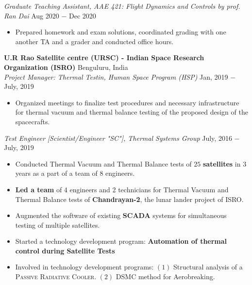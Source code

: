 \documentclass[letterpaper,11pt]{article}
\begin{document}
\vspace{3pt}
\noindent \textit{Graduate Teaching Assistant, AAE 421: Flight Dynamics and Controls by prof. Ran Dai} \hfill Aug 2020 $-$ Dec 2020
\begin{itemize}[noitemsep,nolistsep,leftmargin=0.25in,label={--}]
    \item Prepared homework and exam solutions, coordinated grading with one another 	TA and a grader and conducted office hours.
\end{itemize}

\vspace{5pt}
\noindent \textbf{U.R Rao Satellite centre (URSC) - Indian Space Research Organization (ISRO)} \hfill Benguluru, India \\
\textit{Project Manager: Thermal Testin, Human Space Program (HSP)} \hfill Jan, 2019 $-$ July, 2019
\begin{itemize}[noitemsep,nolistsep,leftmargin=0.25in,label={--}]
    \item Organized meetings to finalize test procedures and necessary infrastructure for thermal vacuum and thermal balance testing of the proposed design of the spacecrafts.
\end{itemize}

\vspace{3pt}
\textit{Test Engineer [Scientist/Engineer "SC"], Thermal Systems Group} \hfill July, 2016 $-$ July, 2019
\begin{itemize}[noitemsep,nolistsep,leftmargin=0.25in,label={--}]
    \item Conducted Thermal Vacuum and Thermal Balance tests of $25$ \textbf{satellites} in 3 years as a part of a team of 8 engineers.
	\item \textbf{Led a team} of 4 engineers and 2 technicians for Thermal Vacuum and Thermal Balance tests of \textbf{Chandrayan-2}, the lunar lander project of ISRO. 
    \item Augmented the software of existing \textbf{SCADA} systems for simultaneous testing of multiple satellites.  
	\item Started a technology development program: \textbf{Automation of thermal control during Satellite Tests}
	\item Involved in technology development programs: $(1)$ Structural analysis of a \textsc{Passive Radiative Cooler}. $(2)$ DSMC method for Aerobreaking.
\end{itemize}



\end{document}
